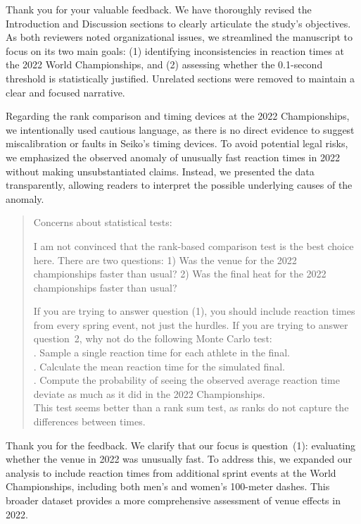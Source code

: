 \documentclass[12pt]{article}
\newenvironment{comment}%
{\begin{quotation}\noindent\small\it\color{darkblue}\ignorespaces%
}{\end{quotation}}
\begin{document}
Thank you for your valuable feedback. We have thoroughly revised the
Introduction and Discussion sections to clearly articulate the study's
objectives. As both reviewers noted organizational issues, we
streamlined the manuscript to focus on its two main goals: (1)
identifying inconsistencies in reaction times at the 2022 World
Championships, and (2) assessing whether the 0.1-second threshold is
statistically justified. Unrelated sections were removed to maintain a
clear and focused narrative.


Regarding the rank comparison and timing devices at the 2022
Championships, we intentionally used cautious language, as there is no
direct evidence to suggest miscalibration or faults in Seiko’s timing
devices. To avoid potential legal risks, we emphasized the observed
anomaly of unusually fast reaction times in 2022 without making
unsubstantiated claims. Instead, we presented the data transparently,
allowing readers to interpret the possible underlying causes of the
anomaly.


\begin{comment}
Concerns about statistical tests:

I am not convinced that the rank-based comparison test is the best choice here.
There are two questions: 1) Was the venue for the 2022 championships faster than
usual? 2) Was the final heat for the 2022 championships faster than usual?

If you are trying to answer question (1), you should include reaction times from
every spring event, not just the hurdles. If you are trying to answer
question~2, why not do the following Monte Carlo test:\\
. Sample a single reaction time for each athlete in the final.\\
. Calculate the mean reaction time for the simulated final.\\
. Compute the probability of seeing the observed average reaction time deviate
as much as it did in the 2022 Championships.\\

This test seems better than a rank sum test, as ranks do not capture the
differences between times.
\end{comment}

Thank you for the feedback. We clarify that our focus is question~(1): 
evaluating whether the venue in 2022 was unusually fast. To address this, 
we expanded our analysis to include reaction times from additional sprint 
events at the World Championships, including both men’s and women’s 
100-meter dashes. This broader dataset provides a more comprehensive 
assessment of venue effects in 2022.
\end{document}
